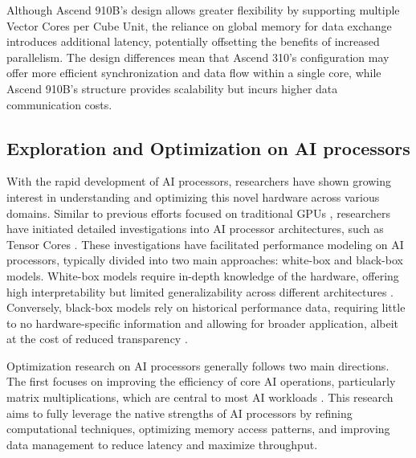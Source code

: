 Although Ascend 910B's design allows greater flexibility by supporting multiple Vector Cores per Cube Unit, the reliance on global memory for data exchange introduces additional latency, potentially offsetting the benefits of increased parallelism. The design differences mean that Ascend 310's configuration may offer more efficient synchronization and data flow within a single core, while Ascend 910B's structure provides scalability but incurs higher data communication costs.

\subsection{Exploration and Optimization on AI processors}
\label{Sec:1_1_3}

With the rapid development of AI processors, researchers have shown growing interest in understanding and optimizing this novel hardware across various domains. Similar to previous efforts focused on traditional GPUs \cite{DBLP:conf/ppopp/ZhangTXLZC17}, researchers have initiated detailed investigations into AI processor architectures, such as Tensor Cores \cite{DBLP:journals/corr/abs-1804-06826}. These investigations have facilitated performance modeling on AI processors, typically divided into two main approaches: white-box and black-box models. White-box models require in-depth knowledge of the hardware, offering high interpretability but limited generalizability across different architectures \cite{DBLP:conf/ispass/RaihanGA19}. Conversely, black-box models rely on historical performance data, requiring little to no hardware-specific information and allowing for broader application, albeit at the cost of reduced transparency \cite{DBLP:conf/nips/ChenZYJMCGK18, DBLP:journals/corr/abs-2008-01040}.

Optimization research on AI processors generally follows two main directions. The first focuses on improving the efficiency of core AI operations, particularly matrix multiplications, which are central to most AI workloads \cite{gccblas, oneapi, 9820727, 9139835}. This research aims to fully leverage the native strengths of AI processors by refining computational techniques, optimizing memory access patterns, and improving data management to reduce latency and maximize throughput.

